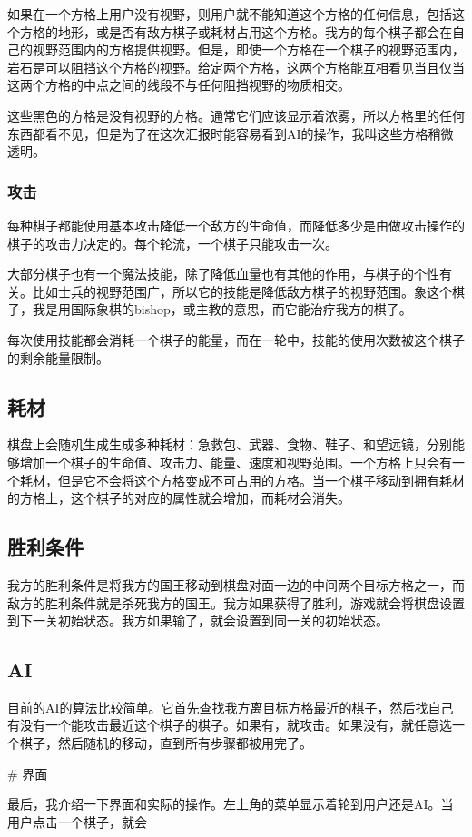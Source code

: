 如果在一个方格上用户没有视野，则用户就不能知道这个方格的任何信息，包括这个方格的地形，或是否有敌方棋子或耗材占用这个方格。我方的每个棋子都会在自己的视野范围内的方格提供视野。但是，即使一个方格在一个棋子的视野范围内，岩石是可以阻挡这个方格的视野。给定两个方格，这两个方格能互相看见当且仅当这两个方格的中点之间的线段不与任何阻挡视野的物质相交。

这些黑色的方格是没有视野的方格。通常它们应该显示着浓雾，所以方格里的任何东西都看不见，但是为了在这次汇报时能容易看到AI的操作，我叫这些方格稍微透明。

\subsubsection{攻击}

每种棋子都能使用基本攻击降低一个敌方的生命值，而降低多少是由做攻击操作的棋子的攻击⼒决定的。每个轮流，一个棋子只能攻击一次。

大部分棋子也有一个魔法技能，除了降低血量也有其他的作用，与棋子的个性有关。比如士兵的视野范围广，所以它的技能是降低敌方棋子的视野范围。象这个棋子，我是用国际象棋的bishop，或主教的意思，而它能治疗我方的棋子。

每次使用技能都会消耗一个棋子的能量，而在一轮中，技能的使用次数被这个棋子的剩余能量限制。

\subsection{耗材}

棋盘上会随机生成生成多种耗材：急救包、武器、食物、鞋子、和望远镜，分别能够增加一个棋子的生命值、攻击⼒、能量、速度和视野范围。一个方格上只会有一个耗材，但是它不会将这个方格变成不可占用的方格。当一个棋子移动到拥有耗材的方格上，这个棋子的对应的属性就会增加，而耗材会消失。

\subsection{胜利条件}

我方的胜利条件是将我方的国王移动到棋盘对面一边的中间两个目标方格之一，而敌方的胜利条件就是杀死我方的国王。我方如果获得了胜利，游戏就会将棋盘设置到下一关初始状态。我方如果输了，就会设置到同一关的初始状态。

\subsection{AI}

目前的AI的算法比较简单。它首先查找我方离目标方格最近的棋子，然后找自己有没有一个能攻击最近这个棋子的棋子。如果有，就攻击。如果没有，就任意选一个棋子，然后随机的移动，直到所有步骤都被用完了。


# 界面

最后，我介绍一下界面和实际的操作。左上角的菜单显示着轮到用户还是AI。当用户点击一个棋子，就会